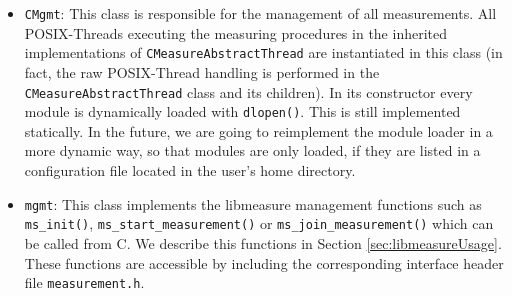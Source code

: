 \begin{description}
\begin{itemize}
		\item \texttt{CMgmt}: This class is responsible for the management of all measurements. All POSIX-Threads executing the measuring procedures in the inherited implementations of \texttt{CMeasureAbstractThread} are instantiated in this class (in fact, the raw POSIX-Thread handling is performed in the \texttt{CMeasureAbstractThread} class and its children). In its constructor every module is dynamically loaded with \texttt{dlopen()}. This is still implemented statically. In the future, we are going to reimplement the module loader in a more dynamic way, so that modules are only loaded, if they are listed in a configuration file located in the user's home directory.
		
		\item \texttt{mgmt}: This class implements the libmeasure management functions such as \texttt{ms\_init()}, \texttt{ms\_start\_measurement()} or \texttt{ms\_join\_measurement()} which can be called from C. We describe this functions in Section \ref{sec:libmeasureUsage}. These functions are accessible by including the corresponding interface header file \texttt{measurement.h}.
	\end{itemize}
	

\end{description}
